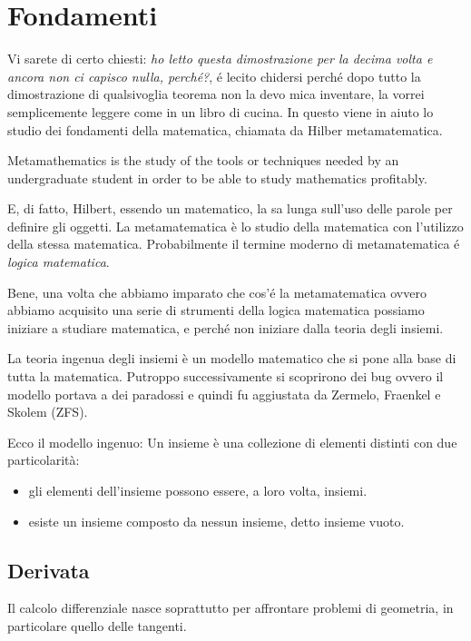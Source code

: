 \chapter{Fondamenti}

Vi sarete di certo chiesti: \textit{ho letto questa dimostrazione per la decima volta e ancora non ci capisco nulla, perch\'e?}, \'e lecito chidersi perch\'e dopo tutto la dimostrazione di qualsivoglia teorema non la devo mica inventare, la vorrei
semplicemente leggere come in un libro di cucina. In questo viene in aiuto lo studio dei fondamenti della matematica, chiamata da Hilber metamatematica.
 
Metamathematics is the study of the tools or techniques needed by an undergraduate student in order to be able to study mathematics profitably. 

E, di fatto, Hilbert, essendo un matematico, la sa lunga sull'uso delle parole per definire gli oggetti. La metamatematica è lo studio della matematica con l'utilizzo della stessa matematica. Probabilmente il termine moderno di metamatematica \'e \textit{logica matematica}.

Bene, una volta che abbiamo imparato che cos'\'e la metamatematica ovvero abbiamo acquisito una serie di strumenti della logica matematica possiamo iniziare a studiare matematica, e perch\'e non iniziare dalla teoria degli insiemi.

La teoria ingenua degli insiemi è un modello matematico che si pone alla base di tutta la matematica.  
Putroppo successivamente si scoprirono dei bug ovvero
il modello portava a dei paradossi e quindi fu aggiustata da Zermelo, Fraenkel e Skolem (ZFS). 

Ecco il modello ingenuo:  
Un insieme è una collezione di elementi distinti con due particolarità:  
\begin{itemize}
 \item gli elementi dell'insieme possono essere, a loro volta, insiemi.
 \item esiste un insieme composto da nessun insieme, detto insieme vuoto.
\end{itemize}




\section{Derivata}
Il calcolo differenziale nasce soprattutto per affrontare problemi di geometria, in particolare quello delle tangenti.




